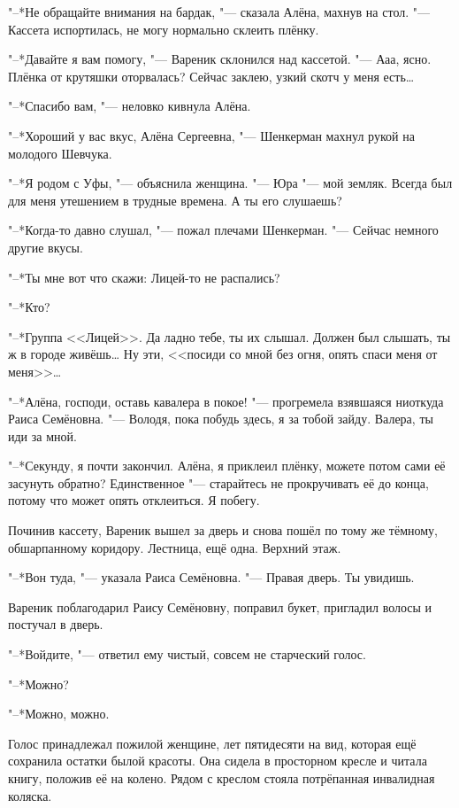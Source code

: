 "--*Не обращайте внимания на бардак, "--- сказала Алёна, махнув на стол.
"--- Кассета испортилась, не могу нормально склеить плёнку.

"--*Давайте я вам помогу, "--- Вареник склонился над кассетой.
"--- Ааа, ясно.
Плёнка от крутяшки оторвалась?
Сейчас заклею, узкий скотч у меня есть\ldots{}

"--*Спасибо вам, "--- неловко кивнула Алёна.

"--*Хороший у вас вкус, Алёна Сергеевна, "--- Шенкерман махнул рукой на молодого Шевчука.

"--*Я родом с Уфы, "--- объяснила женщина.
"--- Юра "--- мой земляк.
Всегда был для меня утешением в трудные времена.
А ты его слушаешь?

"--*Когда-то давно слушал, "--- пожал плечами Шенкерман.
"--- Сейчас немного другие вкусы.

"--*Ты мне вот что скажи: Лицей-то не распались?

"--*Кто?

"--*Группа <<Лицей>>.
Да ладно тебе, ты их слышал.
Должен был слышать, ты ж в городе живёшь\ldots{}
Ну эти, <<посиди со мной без огня, опять спаси меня от меня>>\ldots{}

"--*Алёна, господи, оставь кавалера в покое! "--- прогремела взявшаяся ниоткуда Раиса Семёновна.
"--- Володя, пока побудь здесь, я за тобой зайду.
Валера, ты иди за мной.

"--*Секунду, я почти закончил.
Алёна, я приклеил плёнку, можете потом сами её засунуть обратно?
Единственное "--- старайтесь не прокручивать её до конца, потому что может опять отклеиться.
Я побегу.

Починив кассету, Вареник вышел за дверь и снова пошёл по тому же тёмному, обшарпанному коридору.
Лестница, ещё одна.
Верхний этаж.

"--*Вон туда, "--- указала Раиса Семёновна.
"--- Правая дверь.
Ты увидишь.

Вареник поблагодарил Раису Семёновну, поправил букет, пригладил волосы и постучал в дверь.

"--*Войдите, "--- ответил ему чистый, совсем не старческий голос.

\asterism

"--*Можно?

"--*Можно, можно.

Голос принадлежал пожилой женщине, лет пятидесяти на вид, которая ещё сохранила остатки былой красоты.
Она сидела в просторном кресле и читала книгу, положив её на колено.
Рядом с креслом стояла потрёпанная инвалидная коляска.

